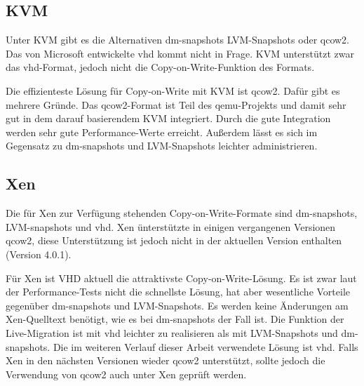 \subsection{KVM}
Unter KVM gibt es die Alternativen dm-snapshots LVM-Snapshots oder qcow2. Das von Microsoft entwickelte vhd kommt nicht in Frage. KVM unterstützt zwar das vhd-Format, jedoch nicht die Copy-on-Write-Funktion des Formats. 

Die effizienteste Lösung für Copy-on-Write mit KVM ist qcow2. Dafür gibt es mehrere Gründe. Das qcow2-Format ist Teil des qemu-Projekts und damit sehr gut in dem darauf basierendem KVM integriert. Durch die gute Integration werden sehr gute Performance-Werte erreicht. Außerdem lässt es sich im Gegensatz zu dm-snapshots und LVM-Snapshots leichter administrieren.

\subsection{Xen}
Die für Xen zur Verfügung stehenden Copy-on-Write-Formate sind dm-snapshots, LVM-snapshots und vhd. Xen ünterstützte in einigen vergangenen Versionen qcow2, diese Unterstützung ist jedoch nicht in der aktuellen Version enthalten (Version 4.0.1). \cite{qcow2support}

Für Xen ist VHD aktuell die attraktivste Copy-on-Write-Lösung. Es ist zwar laut der Performance-Tests nicht die schnellste Lösung, hat aber wesentliche Vorteile gegenüber dm-snapshots und LVM-Snapshots. Es werden keine Änderungen am Xen-Quelltext benötigt, wie es bei dm-snapshots der Fall ist. Die Funktion der Live-Migration ist mit vhd leichter zu realisieren als mit LVM-Snapshots und dm-snapshots. Die im weiteren Verlauf dieser Arbeit verwendete Lösung ist vhd. Falls Xen in den nächsten Versionen wieder qcow2 unterstützt, sollte jedoch die Verwendung von qcow2 auch unter Xen geprüft werden. \cite{racecondition}